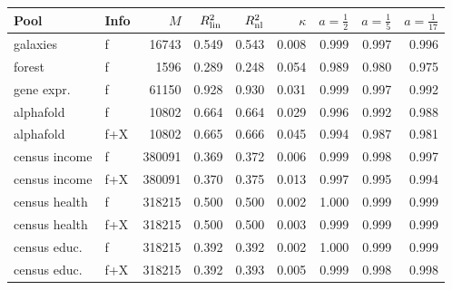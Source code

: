 \begin{tabular}{llrrrrrrr}
\toprule
Pool & Info & $M$ & $R^2_{\rm lin}$ & $R^2_{\rm nl}$ & $\kappa$ & $a{=}\tfrac12$ & $a{=}\tfrac15$ & $a{=}\tfrac1{17}$ \\
\midrule
galaxies & f & 16743 & 0.549 & 0.543 & 0.008 & 0.999 & 0.997 & 0.996 \\
forest & f & 1596 & 0.289 & 0.248 & 0.054 & 0.989 & 0.980 & 0.975 \\
gene expr. & f & 61150 & 0.928 & 0.930 & 0.031 & 0.999 & 0.997 & 0.992 \\
alphafold & f & 10802 & 0.664 & 0.664 & 0.029 & 0.996 & 0.992 & 0.988 \\
alphafold & f+X & 10802 & 0.665 & 0.666 & 0.045 & 0.994 & 0.987 & 0.981 \\
census income & f & 380091 & 0.369 & 0.372 & 0.006 & 0.999 & 0.998 & 0.997 \\
census income & f+X & 380091 & 0.370 & 0.375 & 0.013 & 0.997 & 0.995 & 0.994 \\
census health & f & 318215 & 0.500 & 0.500 & 0.002 & 1.000 & 0.999 & 0.999 \\
census health & f+X & 318215 & 0.500 & 0.500 & 0.003 & 0.999 & 0.999 & 0.999 \\
census educ. & f & 318215 & 0.392 & 0.392 & 0.002 & 1.000 & 0.999 & 0.999 \\
census educ. & f+X & 318215 & 0.392 & 0.393 & 0.005 & 0.999 & 0.998 & 0.998 \\
\bottomrule
\end{tabular}
